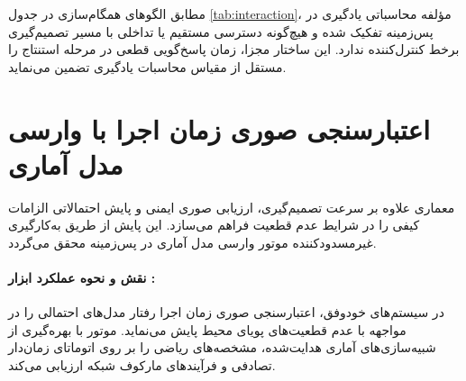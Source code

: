 \documentclass[oneside,openany,phd]{TMU-Thesis}
\begin{document}
\begin{table}[H]
\centering
\caption{الگوهای دسترسی و همگام‌سازی همروند مؤلفه‌ها در مخزن دانش مشترک \cite{kephart2003vision}}
\label{tab:interaction}
\end{table}

مطابق الگوهای همگام‌سازی در جدول \ref{tab:interaction}، مؤلفه محاسباتی یادگیری در پس‌زمینه تفکیک شده و هیچ‌گونه دسترسی مستقیم یا تداخلی با مسیر تصمیم‌گیری برخط کنترل‌کننده ندارد. این ساختار مجزا، زمان پاسخ‌گویی قطعی در مرحله استنتاج را مستقل از مقیاس محاسبات یادگیری تضمین می‌نماید.

\section{اعتبارسنجی صوری زمان اجرا با وارسی مدل آماری }
\label{sec:formal_verification_sec}

معماری  علاوه بر سرعت تصمیم‌گیری، ارزیابی صوری ایمنی و پایش احتمالاتی الزامات کیفی را در شرایط عدم قطعیت فراهم می‌سازد. این پایش از طریق به‌کارگیری غیرمسدودکننده موتور وارسی مدل آماری  \cite{david2015uppaal} در پس‌زمینه محقق می‌گردد.

\paragraph{نقش و نحوه عملکرد ابزار :}
در سیستم‌های خودوفق، اعتبارسنجی صوری زمان اجرا رفتار مدل‌های احتمالی را در مواجهه با عدم قطعیت‌های پویای محیط پایش می‌نماید. موتور  با بهره‌گیری از شبیه‌سازی‌های آماری هدایت‌شده، مشخصه‌های ریاضی را بر روی اتوماتای زمان‌دار تصادفی و فرآیندهای مارکوف شبکه ارزیابی می‌کند.
\end{document}
